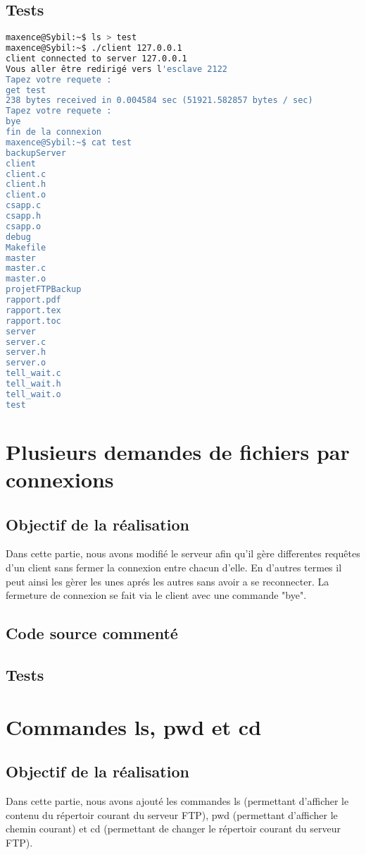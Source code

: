 \documentclass{report}
\begin{document}
      \section{Tests}
\begin{lstlisting}[frame=single,basicstyle=\footnotesize,language=bash]
maxence@Sybil:~$ ls > test
maxence@Sybil:~$ ./client 127.0.0.1
client connected to server 127.0.0.1
Vous aller être redirigé vers l'esclave 2122
Tapez votre requete :
get test
238 bytes received in 0.004584 sec (51921.582857 bytes / sec)
Tapez votre requete :
bye
fin de la connexion
maxence@Sybil:~$ cat test
backupServer
client
client.c
client.h
client.o
csapp.c
csapp.h
csapp.o
debug
Makefile
master
master.c
master.o
projetFTPBackup
rapport.pdf
rapport.tex
rapport.toc
server
server.c
server.h
server.o
tell_wait.c
tell_wait.h
tell_wait.o
test
\end{lstlisting}
    \chapter{Plusieurs demandes de fichiers par connexions}
      \section{Objectif de la r\'ealisation}
	Dans cette partie, nous avons modifi\'e le serveur afin qu'il g\`ere differentes requ\^etes d'un client sans fermer la connexion entre chacun d'elle. En d'autres termes il peut ainsi les g\`erer les unes apr\'es les autres sans avoir a se reconnecter. La fermeture de connexion se fait via le client avec une commande "bye".
      \section{Code source comment\'e}
      \section{Tests}

    \chapter{Commandes ls, pwd et cd}
      \section{Objectif de la r\'ealisation}
	Dans cette partie, nous avons ajout\'e les commandes ls (permettant d'afficher le contenu du r\'epertoir courant du serveur FTP), pwd (permettant d'afficher le chemin courant) et cd (permettant de changer le r\'epertoir courant du serveur FTP). \\
\end{document}
